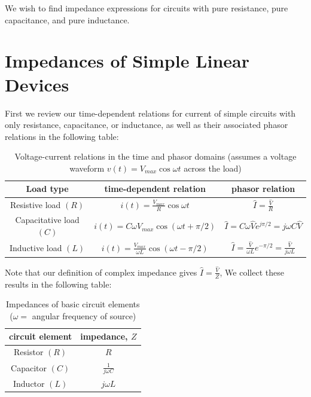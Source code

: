 We wish to find impedance expressions for circuits with pure resistance, pure capacitance, and pure inductance.

\section{Impedances of Simple Linear Devices}

First we review our time-dependent relations for current of simple circuits with only resistance, capacitance, or inductance, as well as their associated phasor relations in the following table:

\begin{table}[H]
    \centering
    \caption{Voltage-current relations in the time and phasor domains (assumes a voltage waveform $v(t) = V_{max}\cos\omega t$ across the load)}
    \begin{tabular}{c|c|c}
        Load type & time-dependent relation & phasor relation \\ \hline
        Resistive load $(R)$ & $i(t) = \frac{V_{max}}{R}\cos\omega t$ & $\hat{I} = \frac{\hat{V}}{R}$ \\
        Capacitative load $(C)$ & $i(t) = C\omega V_{max}\cos(\omega t + \pi/2)$ & $\hat{I} = C\omega \hat{V}e^{j\pi/2} = j\omega C\hat{V}$ \\ 
        Inductive load $(L)$ & $i(t) = \frac{V_{max}}{\omega L}\cos(\omega t-\pi/2)$ & $\hat{I} = \frac{\hat{V}}{\omega L}e^{-\pi/2} = \frac{\hat{V}}{j\omega L}$ \\ \hline
    \end{tabular}
    \label{tag:simpleLoads}
\end{table}

Note that our definition of complex impedance gives $\hat{I} = \frac{\hat{V}}{Z}$, We collect these results in the following table:


\begin{table}[H]
    \centering
    \caption{Impedances of basic circuit elements ($\omega = $ angular frequency of source)}
    \begin{tabular}{c|c}
        circuit element & impedance, $Z$ \\ \hline 
        Resistor $(R)$ & $R$ \\ 
        Capacitor $(C)$ & $\frac{1}{j\omega C}$ \\
        Inductor $(L)$ & $j\omega L$ \\ \hline
    \end{tabular}
    \label{tag:simpleLoadsImpedances}
\end{table}

